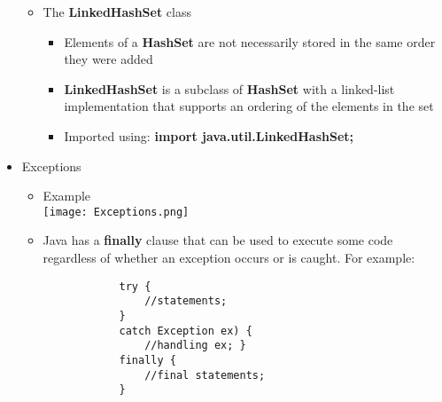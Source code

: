 \begin{itemize}
\begin{itemize}
		\item The \textbf{LinkedHashSet} class
		\begin{itemize}
			\item Elements of a \textbf{HashSet} are not necessarily stored in the same
			order they were added
			\item \textbf{LinkedHashSet} is a subclass of \textbf{HashSet} with a linked-list implementation that supports an ordering of the elements in the set
			\item Imported using: \textbf{import java.util.LinkedHashSet;}
		\end{itemize}
	\end{itemize}

	\item Exceptions
	\begin{itemize}
		\item Example\\
		\texttt{[image: Exceptions.png]}
		\item Java has a \textbf{finally} clause that can be used to execute some code regardless of whether an exception occurs or is caught. For example:
		\begin{Verbatim}
			try {
				//statements;
			}
			catch Exception ex) {
				//handling ex; }
			finally {
				//final statements;
			}
		\end{Verbatim}
	\end{itemize}
\end{itemize}
\newpage

